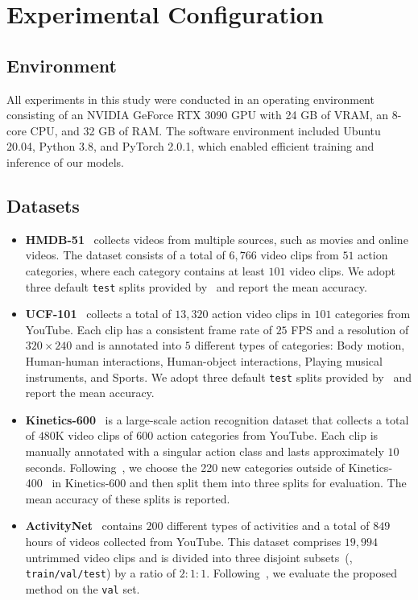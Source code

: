 \section{Experimental Configuration}
\subsection{Environment}
{All experiments in this study were conducted in an operating environment consisting of an NVIDIA GeForce RTX 3090 GPU with 24 GB of VRAM, an 8-core CPU, and 32 GB of RAM. The software environment included Ubuntu 20.04, Python 3.8, and PyTorch 2.0.1, which enabled efficient training and inference of our models.}

\subsection{Datasets}
\begin{itemize}
    \item \textbf{HMDB-51}~\cite{kuehne2011hmdb} collects videos from multiple sources, such as movies and online videos. The dataset consists of a total of $6,766$ video clips from $51$ action categories, where each category contains at least $101$ video clips. We adopt three default \texttt{test} splits provided by~\cite{kuehne2011hmdb} and report the mean accuracy.
    \item \textbf{UCF-101}~\cite{soomro2012ucf101dataset101human} collects a total of $13,320$ action video clips in $101$ categories from YouTube. Each clip has a consistent frame rate of $25$ FPS and a resolution of $320 \times 240$ and is annotated into $5$ different types of categories: Body motion, Human-human interactions, Human-object interactions, Playing musical instruments, and Sports. We adopt three default \texttt{test} splits provided by~\cite{kuehne2011hmdb} and report the mean accuracy.
    \item \textbf{Kinetics-600}~\cite{carreira2018shortnotekinetics600} is a large-scale action recognition dataset that collects a total of $480$K video clips of $600$ action categories from YouTube. Each clip is manually annotated with a singular action class and lasts approximately $10$ seconds. Following~\cite{chen2021elaborative}, we choose the 220 new categories outside of Kinetics-400~\cite{kay2017kinetics} in Kinetics-600 and then split them into three splits for evaluation. The mean accuracy of these splits is reported.
    \item \textbf{ActivityNet}~\cite{caba2015activitynet} contains $200$ different types of activities and a total of $849$ hours of videos collected from YouTube. This dataset comprises $19,994$ untrimmed video clips and is divided into three disjoint subsets~(\ie, \texttt{train/val/test}) by a ratio of $2:1:1$. Following~\cite{yan_2024_DTSTPT}, we evaluate the proposed method on the \texttt{val} set.
\end{itemize}



